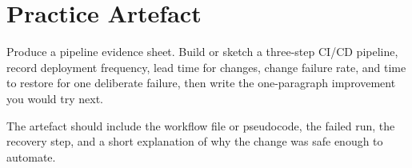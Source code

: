 \section{Practice Artefact}

Produce a pipeline evidence sheet. Build or sketch a three-step CI/CD pipeline, record deployment frequency, lead time for changes, change failure rate, and time to restore for one deliberate failure, then write the one-paragraph improvement you would try next.


The artefact should include the workflow file or pseudocode, the failed run, the recovery step, and a short explanation of why the change was safe enough to automate.
